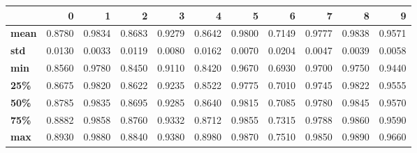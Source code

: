 \begin{tabular}{lrrrrrrrrrr}
\toprule
{} &       0 &       1 &       2 &       3 &       4 &       5 &       6 &       7 &       8 &       9 \\
\midrule
\textbf{mean} &  0.8780 &  0.9834 &  0.8683 &  0.9279 &  0.8642 &  0.9800 &  0.7149 &  0.9777 &  0.9838 &  0.9571 \\
\textbf{std } &  0.0130 &  0.0033 &  0.0119 &  0.0080 &  0.0162 &  0.0070 &  0.0204 &  0.0047 &  0.0039 &  0.0058 \\
\textbf{min } &  0.8560 &  0.9780 &  0.8450 &  0.9110 &  0.8420 &  0.9670 &  0.6930 &  0.9700 &  0.9750 &  0.9440 \\
\textbf{25\% } &  0.8675 &  0.9820 &  0.8622 &  0.9235 &  0.8522 &  0.9775 &  0.7010 &  0.9745 &  0.9822 &  0.9555 \\
\textbf{50\% } &  0.8785 &  0.9835 &  0.8695 &  0.9285 &  0.8640 &  0.9815 &  0.7085 &  0.9780 &  0.9845 &  0.9570 \\
\textbf{75\% } &  0.8882 &  0.9858 &  0.8760 &  0.9332 &  0.8712 &  0.9855 &  0.7315 &  0.9788 &  0.9860 &  0.9590 \\
\textbf{max } &  0.8930 &  0.9880 &  0.8840 &  0.9380 &  0.8980 &  0.9870 &  0.7510 &  0.9850 &  0.9890 &  0.9660 \\
\bottomrule
\end{tabular}
